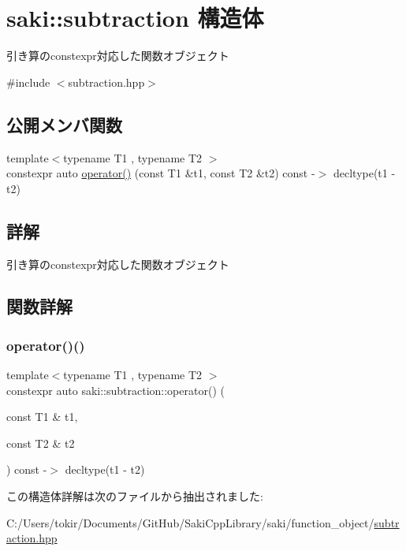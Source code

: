 \hypertarget{structsaki_1_1subtraction}{}\section{saki\+:\+:subtraction 構造体}
\label{structsaki_1_1subtraction}


引き算のconstexpr対応した関数オブジェクト  




{\ttfamily \#include $<$subtraction.\+hpp$>$}

\subsection*{公開メンバ関数}
\begin{DoxyCompactItemize}
\item 
{\footnotesize template$<$typename T1 , typename T2 $>$ }\\constexpr auto \mbox{\hyperlink{structsaki_1_1subtraction_a5de4626c125df92e70848fcac27eef74}{operator()}} (const T1 \&t1, const T2 \&t2) const -\/$>$ decltype(t1 -\/ t2)
\end{DoxyCompactItemize}


\subsection{詳解}
引き算のconstexpr対応した関数オブジェクト 

\subsection{関数詳解}
\mbox{\label{structsaki_1_1subtraction_a5de4626c125df92e70848fcac27eef74}} 
\subsubsection{\texorpdfstring{operator()()}{operator()()}}
{\footnotesize\ttfamily template$<$typename T1 , typename T2 $>$ \\
constexpr auto saki\+::subtraction\+::operator() (\begin{DoxyParamCaption}\item[{const T1 \&}]{t1,  }\item[{const T2 \&}]{t2 }\end{DoxyParamCaption}) const -\/$>$ decltype(t1 -\/ t2)
	\hspace{0.3cm}{\ttfamily [inline]}}



この構造体詳解は次のファイルから抽出されました\+:\begin{DoxyCompactItemize}
\item 
C\+:/\+Users/tokir/\+Documents/\+Git\+Hub/\+Saki\+Cpp\+Library/saki/function\+\_\+object/\mbox{\hyperlink{subtraction_8hpp}{subtraction.\+hpp}}\end{DoxyCompactItemize}

